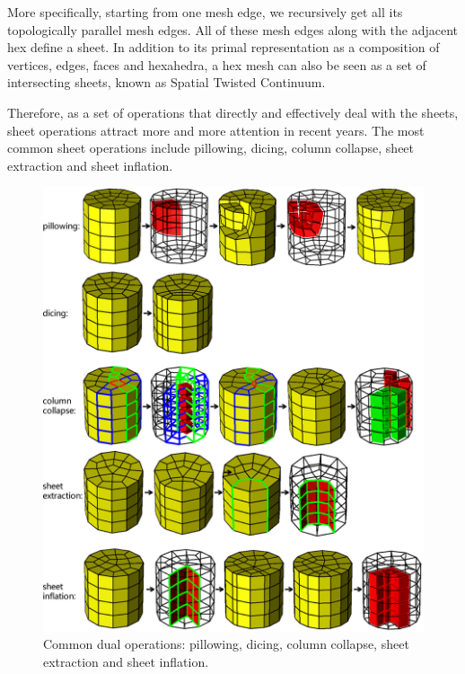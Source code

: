 \documentclass[final,5p,times,twocolumn]{elsarticle}
\begin{document}
More specifically, starting from one mesh edge, we recursively get all its topologically parallel mesh edges. All of these mesh edges along with the adjacent hex define a sheet. In addition to its primal representation as a composition of vertices, edges, faces and hexahedra, a hex mesh can also be seen as a set of intersecting sheets, known as Spatial Twisted Continuum\cite{Murdoch:1997fy}.

Therefore, as a set of operations that directly and effectively deal with the sheets, sheet operations attract more and more attention in recent years. The most common sheet operations include pillowing\cite{Mitchell:1995wa}, dicing\cite{melander1997generation}, column collapse\cite{Staten:2009bo}, sheet extraction\cite{Borden:2002hs,Staten:2009bo} and sheet inflation\cite{Ledoux:2009jz,staten2010sheet,Staten:2009bo}. 

\begin{figure}[htbp]
\begin{center}
\includegraphics[width=17cm]{rev_figures/dual_operations.png}
\caption{Common dual operations: pillowing, dicing, column collapse, sheet extraction and sheet inflation.}
\label{fig:dual_operations}
\end{center}
\end{figure}
\end{document}
